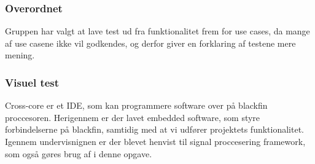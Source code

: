 \subsubsection{Overordnet}
Gruppen har valgt at lave test ud fra funktionalitet frem for use cases, da mange af use casene ikke vil godkendes, og derfor giver en forklaring af testene mere mening. 
 
\subsubsection{Visuel test}
Cross-core er et IDE, som kan programmere software over på blackfin proccesoren. Herigennem er der lavet embedded software, som styre forbindelserne på blackfin, samtidig med at vi udfører projektets funktionalitet. Igennem undervisnignen er der blevet henvist til signal proccesering framework, som også gøres brug af i denne opgave. 

